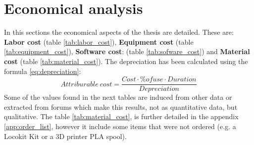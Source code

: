 \chapter{Economical analysis} %
\label{cha:economical_aspects}
In this sections the economical aspects of the thesis are detailed.
These are: \textbf{Labor cost} (table \ref{tab:labor_cost}), \textbf{Equipment cost} (table \ref{tab:equipment_cost}), \textbf{Software cost}: (table \ref{tab:sofware_cost}) and \textbf{Material cost} (table \ref{tab:material_cost}).
The depreciation has been calculated using the formula \ref{eq:depreciation}:
\begin{equation}
  \label{eq:depreciation}
  Attriburable\ cost  = \frac{Cost \cdot \% of use \cdot Duration}{Depreciation}
\end{equation}
Some of the values found in the next tables are induced from other data or extracted from forums which make this results, not as quantitative data, but qualitative.
The table \ref{tab:material_cost}, is further detailed in the appendix \ref{app:order_list}, however it include some items that were not ordered (e.g. a Locokit Kit or a 3D printer PLA spool).

\begin{table}[htbp]
\caption{Labor cost}
\label{tab:labor_cost}
\end{table}

